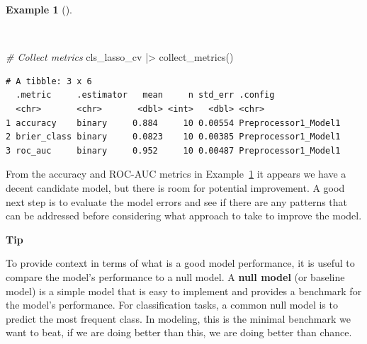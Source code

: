 \documentclass[
  letterpaper,
  krantz1]{latex/krantz-mod}
\newenvironment{Shaded}{\begin{snugshade}}{\end{snugshade}}
\newcommand{\CommentTok}[1]{\textcolor[rgb]{0.00,0.00,0.00}{\textit{#1}}}
\newcommand{\FunctionTok}[1]{\textcolor[rgb]{0.00,0.00,0.00}{#1}}
\newcommand{\NormalTok}[1]{\textcolor[rgb]{0.00,0.00,0.00}{#1}}
\newcommand{\SpecialCharTok}[1]{\textcolor[rgb]{0.00,0.00,0.00}{#1}}
\theoremstyle{definition}
\newtheorem{example}{Example}[chapter]
\theoremstyle{definition}
\theoremstyle{remark}
\begin{document}
\begin{example}[]\protect\hypertarget{exm-predict-class-tune-hyperparameters-evaluate-workflow-cv-collect}{}\label{exm-predict-class-tune-hyperparameters-evaluate-workflow-cv-collect}

~

\begin{Shaded}
\begin{Highlighting}[numbers=left,,]
\CommentTok{\# Collect metrics}
\NormalTok{cls\_lasso\_cv }\SpecialCharTok{|\textgreater{}} \FunctionTok{collect\_metrics}\NormalTok{()}
\end{Highlighting}
\end{Shaded}

\begin{verbatim}
# A tibble: 3 x 6
  .metric     .estimator   mean     n std_err .config             
  <chr>       <chr>       <dbl> <int>   <dbl> <chr>               
1 accuracy    binary     0.884     10 0.00554 Preprocessor1_Model1
2 brier_class binary     0.0823    10 0.00385 Preprocessor1_Model1
3 roc_auc     binary     0.952     10 0.00487 Preprocessor1_Model1
\end{verbatim}

\end{example}

From the accuracy and ROC-AUC metrics in
Example~\ref{exm-predict-class-tune-hyperparameters-evaluate-workflow-cv-collect}
it appears we have a decent candidate model, but there is room for
potential improvement. A good next step is to evaluate the model errors
and see if there are any patterns that can be addressed before
considering what approach to take to improve the model.

\begin{tcolorbox}[enhanced jigsaw, leftrule=.75mm, colframe=quarto-callout-color-frame, left=2mm, colback=white, toprule=.15mm, breakable, arc=.35mm, opacityback=0, bottomrule=.15mm, rightrule=.15mm]

\textbf{ Tip}

To provide context in terms of what is a good model performance, it is
useful to compare the model's performance to a null model. A
\textbf{null model } (or baseline model) is a simple model that is easy
to implement and provides a benchmark for the model's performance. For
classification tasks, a common null model is to predict the most
frequent class. In modeling, this is the minimal benchmark we want to
beat, if we are doing better than this, we are doing better than chance.

\end{tcolorbox}
\end{document}
